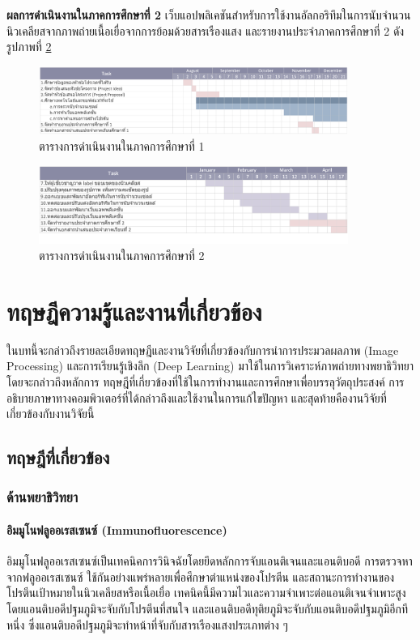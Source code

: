 \documentclass[12pt,oneside,openright,a4paper]{cpe-thai-project}
\begin{document}
\textbf{ผลการดำเนินงานในภาคการศึกษาที่ 2} เว็บแอปพลิเคชันสำหรับการใช้งานอัลกอริทึมในการนับจำนวนนิวเคลียสจากภาพถ่ายเนื้อเยื่อจากการย้อมด้วยสารเรืองแสง และรายงานประจำภาคการศึกษาที่ 2 ดังรูปภาพที่ \ref{fig:g2}
\begin{figure}[!h] 
\centering
\includegraphics[width=0.9\textwidth]{images/gant1.png}
\caption{ตารางการดำเนินงานในภาคการศึกษาที่ 1}\label{fig:g1}
\end{figure}
\begin{figure}[!h]
\centering
\includegraphics[width=0.9\textwidth]{images/gaint2.png}
\caption{ตารางการดำเนินงานในภาคการศึกษาที่ 2}\label{fig:g2}
\end{figure}
\chapter{ทฤษฎีความรู้และงานที่เกี่ยวข้อง}
ในบทนี้จะกล่าวถึงรายละเอียดทฤษฎีและงานวิจัยที่เกี่ยวข้องกับการนำการประมวลผลภาพ (Image Processing) และการเรียนรู้เชิงลึก (Deep Learning) มาใช้ในการวิเคราะห์ภาพถ่ายทางพยาธิวิทยา โดยจะกล่าวถึงหลักการ ทฤษฎีที่เกี่ยวข้องที่ใช้ในการทํางานและการศึกษาเพื่อบรรลุวัตถุประสงค์ การอธิบายภาษาทางคอมพิวเตอร์ที่ได้กล่าวถึงและใช้งานในการแก้ไขปัญหา และสุดท้ายคืองานวิจัยที่เกี่ยวข้องกับงานวิจัยนี้ 

\section{ทฤษฎีที่เกี่ยวข้อง}
\subsection{ด้านพยาธิวิทยา}
\subsubsection{อิมมูโนฟลูออเรสเซนซ์ (Immunofluorescence)}
อิมมูโนฟลูออเรสเซนซ์เป็นเทคนิคการวินิจฉัยโดยยึดหลักการจับแอนติเจนและแอนติบอดี การตรวจหาจากฟลูออเรสเซนซ์ ใช้กันอย่างแพร่หลายเพื่อศึกษาตำแหน่งของโปรตีน และสถานะการทำงานของโปรตีนเป้าหมายในนิวเคลียสหรือเนื้อเยื่อ เทคนิคนี้มีความไวและความจำเพาะต่อแอนติเจนจำเพาะสูง โดยแอนติบอดีปฐมภูมิจะจับกับโปรตีนที่สนใจ และแอนติบอดีทุติยภูมิจะจับกับแอนติบอดีปฐมภูมิอีกทีหนึ่ง ซึ่งแอนติบอดีปฐมภูมิจะทำหน้าที่จับกับสารเรืองแสงประเภทต่าง ๆ \cite{12} 
\end{document}
